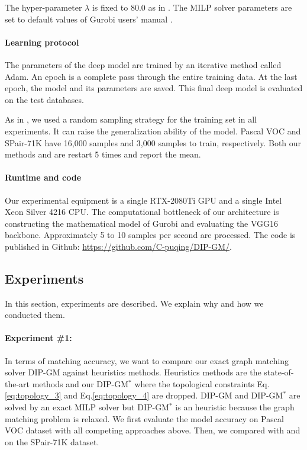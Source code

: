 \documentclass[times,onecolumn,final,authoryear]{article}
\theoremstyle{definition}
\begin{document}
The hyper-parameter $\lambda$ is fixed to 80.0 as in \cite{BB-GM}. The MILP solver parameters are set to default values of Gurobi users' manual \cite{gurobi}.


\paragraph{Learning protocol}
The parameters of the deep model are trained by an iterative method called Adam. An epoch is a complete pass through the entire training data. At the last epoch, the model and its parameters are saved. This final deep model is evaluated on the test databases. 

As in \cite{BB-GM}, we used a random sampling strategy for the training set in all experiments. It can raise the generalization ability of the model. 
Pascal VOC \cite{everingham2010pascal} and SPair-71K \cite{min2019spair} have 16,000 samples and 3,000 samples to train, respectively. Both our methods and \cite{BB-GM} are restart 5 times and report the mean.


\paragraph{Runtime and code}
Our experimental equipment is a single RTX-2080Ti GPU and a single Intel Xeon Silver 4216 CPU. The computational bottleneck of our architecture is constructing the mathematical model of Gurobi \cite{gurobi} and evaluating the VGG16 backbone. Approximately 5 to 10 samples per second are processed. The code is published in Github: \url{https://github.com/C-puqing/DIP-GM/}.


\subsection{Experiments}
In this section, experiments are described. We explain why and how we conducted them.

\paragraph{Experiment \#1: } In terms of matching accuracy, we want to compare our exact graph matching solver DIP-GM against heuristics methods. Heuristics methods are the state-of-the-art methods and our DIP-GM$^*$ where the topological constraints Eq.\eqref{eq:topology_3} and Eq.\eqref{eq:topology_4} are dropped. DIP-GM and DIP-GM$^*$ are solved by an exact MILP solver but DIP-GM$^*$ is an heuristic because the graph matching problem is relaxed. We first evaluate the model accuracy on Pascal VOC\cite{everingham2010pascal} dataset with all competing approaches above. Then, we compared with \cite{DGMC} and \cite{BB-GM} on the SPair-71K dataset.
\end{document}
